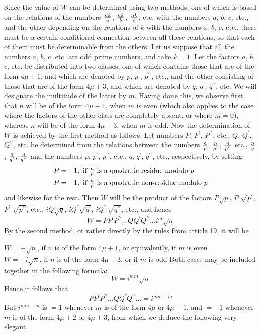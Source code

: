 \documentclass[twoside,12pt]{memoir}
\renewenvironment{quote}%
  {\list{}{\leftmargin=5em\rightmargin=0em}\item[]}%
  {\endlist}
\let\oldfrac\frac
\def\frac#1#2{\mathchoice{\tfrac{#1}{#2}}{\oldfrac{#1}{#2}}{\genfrac{}{}{}{2}{#1}{#2\mathstrut}}{\genfrac{}{}{}{3}{#1}{#2\mathstrut}}}
\begin{document}
Since the value of \(W\) can be determined using two methods, one of which is based on the relations of the numbers \(\frac{n k}{a}\), \(\frac{n k}{b}\), \(\frac{n k}{c}\), etc{.} with the numbers \(a\), \(b\), \(c\), etc{.}, and the other depending on the relations of \(k\) with the numbers \(a\), \(b\), \(c\), etc{.}, there must be a certain conditional connection between all these relations, so that each of them must be determinable from the others. Let us suppose that all the numbers \(a\), \(b\), \(c\), etc{.} are odd prime numbers, and take \(k=1\). Let the factors \(a\), \(b\), \(c\), etc{.} be distributed into two classes, one of which contains those that are of the form \(4\mu+1\), and which are denoted by \(p\), \(p^{\prime}\), \(p^{\prime\prime}\), etc{.}, and the other consisting of those that are of the form \(4\mu+3\), and which are denoted by \(q\), \(q^{\prime}\), \(q^{\prime\prime}\), etc{.} We will designate the multitude of the latter by \(m\). Having done this, we observe first that \(n\) will be of the form \(4\mu+1\), when \(m\) is even (which also applies to the case where the factors of the other class are completely absent, or where \(m=0\)), whereas \(n\) will be of the form \(4\mu+3\), when \(m\) is odd. Now the determination \pagebreak%
of \(W\) is achieved by the first method as follows. Let numbers \(P\), \(P^{\prime}\), \(P^{\prime\prime}\), etc{.}, \(Q\), \(Q^{\prime}\), \(Q^{\prime\prime}\), etc{.} be determined from the relations between the numbers \(\frac{n}{p}\), \(\frac{n}{p^{\prime}}\), \(\frac{n}{p^{\prime \prime}}\) etc., \(\frac{n}{q}\), \(\frac{n}{q^{\prime}}\), \(\frac{n}{q^{\prime \prime}}\) and the numbers \(p\), \(p^{\prime}\), \(p^{\prime\prime}\), etc{.}, \(q\), \(q^{\prime}\), \(q^{\prime\prime}\), etc{.}, respectively, by setting
\[\begin{aligned}
& P=+1, \text{ if } \frac{n}{p} \text{ is a quadratic residue modulo } p \\
& P=-1, \text{ if } \frac{n}{p} \text{ is a quadratic non-residue modulo } p
\end{aligned}\]
and likewise for the rest. Then \(W\) will be the product of the factors \(P \sqrt{p}\), \(P^{\prime} \sqrt{p^{\prime}}\), \(P^{\prime\prime} \sqrt{p^{\prime\prime}}\), etc{.}, \(iQ \sqrt{q}\), \(iQ^{\prime} \sqrt{q^{\prime}}\), \(iQ^{\prime\prime} \sqrt{q^{\prime\prime}}\), etc{.}, and hence
\[W=P P^{\prime} P^{\prime\prime} \ldots Q Q^{\prime} Q^{\prime\prime} \ldots i^{m} \sqrt{n}\]
By the second method, or rather directly by the rules from article 19, it will be
\begin{quote}\(W=+\surd{n}\), if \(n\) is of the form \(4\mu+1\), or equivalently, if \(m\) is even\\
\(W=+i \surd{n}\), if \(n\) is of the form \(4\mu+3\), or if \(m\) is odd\end{quote}
Both cases may be included together in the following formula:
\[W=i^{m m} \surd{n}\]
Hence it follows that
\[P P^{\prime} P^{\prime\prime} \ldots Q Q^{\prime} Q^{\prime\prime} \ldots=i^{m m-m}\]
But \(i^{m m-m}\) is \(=1\) whenever \(m\) is of the form \(4\mu\) or \(4\mu+1\), and \(=-1\) whenever \(m\) is of the form \(4\mu+2\) or \(4\mu+3\), from which we deduce the following very elegant
\end{document}
